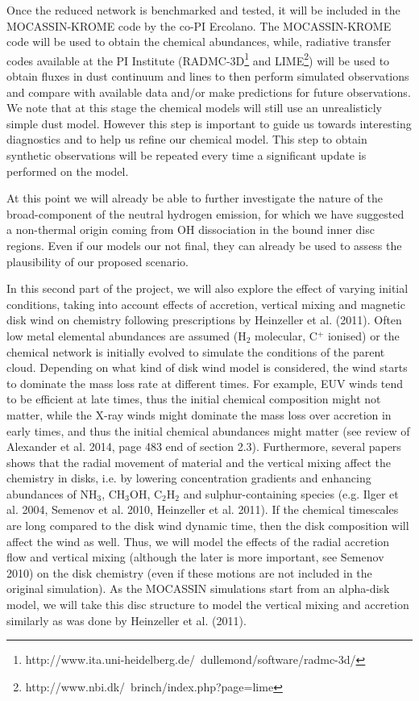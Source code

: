 \documentclass[10pt,fleqn,twoside]{article}
\begin{document}
 Once the reduced network is benchmarked and tested, it will be included in the MOCASSIN-KROME code by the co-PI Ercolano. The MOCASSIN-KROME code will be used to obtain the chemical abundances, while, radiative transfer codes available at the PI Institute (RADMC-3D\footnote{http://www.ita.uni-heidelberg.de/~dullemond/software/radmc-3d/} and LIME\footnote{http://www.nbi.dk/~brinch/index.php?page=lime}) will be used to obtain fluxes in dust continuum and lines to then perform simulated observations and compare with available data and/or make predictions for future observations. We note that at this stage the chemical models will still use an unrealisticly simple dust model. However this step is important to guide us towards interesting diagnostics and to help us refine our chemical model. This step to obtain synthetic observations will be repeated every time a significant update is performed on the model. 

At this point we will already be able to further investigate the nature of the broad-component of the neutral hydrogen emission, for which we have suggested a non-thermal origin coming from OH dissociation in the bound inner disc regions. Even if our models our not final, they can already be used to assess the plausibility of our proposed scenario.

In this second part of the project, we will also explore the effect of
varying initial conditions, taking into account effects of accretion,
vertical mixing and magnetic disk wind on chemistry following
prescriptions by Heinzeller et al. (2011). Often low metal elemental
abundances are assumed (H$_2$ molecular, C$^+$ ionised) or the
chemical network is initially evolved to simulate the conditions of
the parent cloud.  Depending on what kind of disk wind model is
considered, the wind starts to dominate the mass loss rate at
different times. For example, EUV winds tend to be efficient at late
times, thus the initial chemical composition might not matter, while
the X-ray winds might dominate the mass loss over accretion in early
times, and thus the initial chemical abundances might matter (see
review of Alexander et al. 2014, page 483 end of section
2.3). Furthermore, several papers shows that the radial movement of
material and the vertical mixing affect the chemistry in disks,
i.e. by lowering concentration gradients and enhancing abundances of
NH$_3$, CH$_3$OH, C$_2$H$_2$ and sulphur-containing species
(e.g. Ilger et al. 2004, Semenov et al. 2010, Heinzeller et
al. 2011). If the chemical timescales are long compared to the disk
wind dynamic time, then the disk composition will affect the wind as
well. Thus, we will model the effects of the radial accretion flow and
vertical mixing (although the later is more important, see Semenov
2010) on the disk chemistry (even if these motions are not included in
the original simulation). As the MOCASSIN simulations start from an
alpha-disk model, we will take this disc structure to model the
vertical mixing and accretion similarly as was done by Heinzeller et
al. (2011). 
\end{document}
